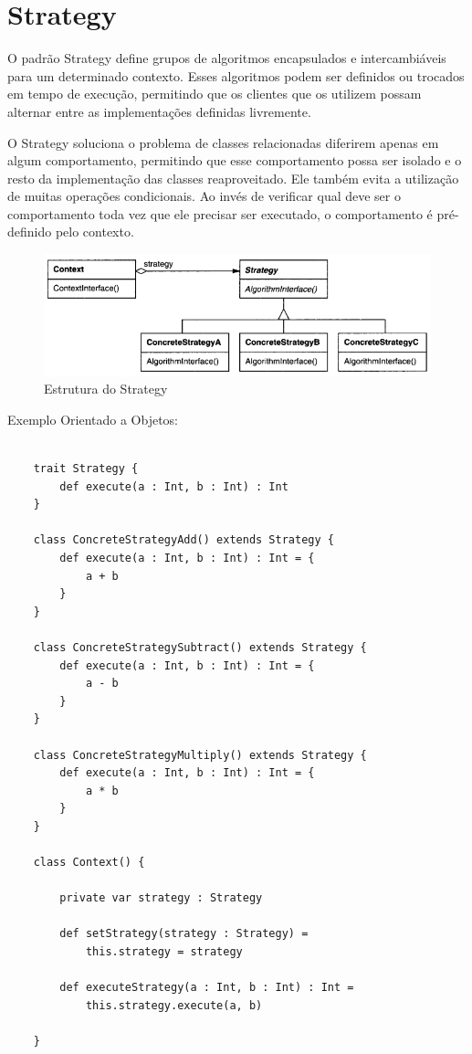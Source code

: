 \section{Strategy}

O padrão Strategy define grupos de algoritmos encapsulados e
 intercambiáveis para um determinado contexto. Esses 
 algoritmos podem ser definidos ou trocados em tempo de 
 execução, permitindo que os clientes que os utilizem possam
  alternar entre as implementações definidas livremente.

O Strategy soluciona o problema de classes relacionadas 
diferirem apenas em algum comportamento, permitindo que 
esse comportamento possa ser isolado e o resto da implementação 
das classes reaproveitado. Ele também evita a utilização de 
muitas operações condicionais. Ao invés de verificar qual 
deve ser o comportamento toda vez que ele precisar ser 
executado, o comportamento é pré-definido pelo contexto.

\begin{figure}[htb]
	\caption{\label{strategy_struct}Estrutura do Strategy}
	\begin{center}
	    \includegraphics[scale=0.5]{5_padroes-contexto-funcional/5.3_comportamentais/5.3.09_strategy/diagram.png}
	\end{center}
\end{figure}

Exemplo Orientado a Objetos:

\begin{lstlisting}[caption={Strategy Orientação a Objetos},label=oostrategy]
    
    trait Strategy {
        def execute(a : Int, b : Int) : Int
    }

    class ConcreteStrategyAdd() extends Strategy {
        def execute(a : Int, b : Int) : Int = {
            a + b
        }
    }

    class ConcreteStrategySubtract() extends Strategy {
        def execute(a : Int, b : Int) : Int = {
            a - b
        }
    }

    class ConcreteStrategyMultiply() extends Strategy {
        def execute(a : Int, b : Int) : Int = {
            a * b
        }
    }

    class Context() {
        
        private var strategy : Strategy

        def setStrategy(strategy : Strategy) =
            this.strategy = strategy

        def executeStrategy(a : Int, b : Int) : Int =
            this.strategy.execute(a, b)

    }

\end{lstlisting}

